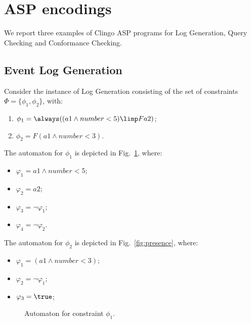 
\section{ASP encodings}
We report three examples of Clingo ASP programs for Log Generation,
Query Checking and Conformance Checking.

\subsection{Event Log Generation}
Consider the instance of 
Log Generation consisting of the set of 
constraints $\Phi=\{\phi_1,\phi_2\}$, with:
\begin{enumerate}
 \item $\phi_1=\always((a1 \land number<5)\limp F a2)$;
 \item $\phi_2=F (a1 \land number < 3)$.
\end{enumerate}
The automaton for $\phi_1$ is depicted in Fig.~\ref{fig:response},
where:
\begin{itemize}
	\item $\varphi_1=a1 \land number<5$;
	\item $\varphi_2=a2$;
	\item $\varphi_3=\lnot \varphi_1$;
	\item $\varphi_4=\lnot\varphi_2$.
\end{itemize}
The automaton for $\phi_2$ is depicted in Fig.~\ref{fig:presence},
where:
\begin{itemize}
	\item $\varphi_1=(a1 \land number < 3)$;
	\item $\varphi_2=\lnot\varphi_1$;
	\item $\varphi_3=\true$;
\end{itemize}
\begin{figure}
	\begin{center}
	\end{center}
\caption{Automaton for constraint $\phi_1$.\label{fig:response}}
\end{figure}
